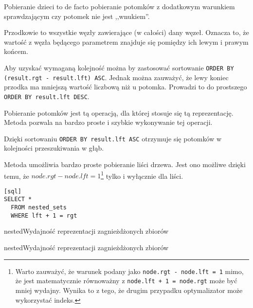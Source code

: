 Pobieranie dzieci to de facto pobieranie potomków z dodatkowym warunkiem sprawdzającym czy potomek nie jest ,,wnukiem''.






Przodkowie to wszystkie węzły zawierające (w całości) dany węzeł.
Oznacza to, że wartość z węzła będącego parametrem znajduje się pomiędzy ich lewym i prawym końcem. 



Aby uzyskać wymaganą kolejność można by zastosować sortowanie \texttt{ORDER BY (result.rgt - result.lft) ASC}.
Jednak można zauważyć, że lewy koniec przodka ma mniejszą wartość liczbową niż u potomka.
Prowadzi to do prostszego \texttt{ORDER BY result.lft DESC}.


Pobieranie potomków jest tą operacją, dla której stosuje się tą reprezentację.
Metoda pozwala na bardzo proste i szybkie wykonywanie tej operacji.


Dzięki sortowaniu \texttt{ORDER BY result.lft ASC} otrzymuje się potomków w kolejności przeszukiwania w głąb.



Metoda umożliwia bardzo proste pobieranie liści drzewa.
Jest ono możliwe dzięki temu, że $node.rgt - node.lft = 1$\footnote{
    Warto zauważyć, że warunek podany jako \texttt{node.rgt - node.lft = 1} mimo,
    że jest matematycznie równoważny z \texttt{node.lft + 1 = node.rgt} może być mniej wydajny.
    Wynika to z tego, że drugim przypadku optymalizator może wykorzystać indeks.
}
tylko i wyłącznie dla liści. 
\begin{verbatim}[sql]
SELECT *
  FROM nested_sets
  WHERE lft + 1 = rgt
\end{verbatim}





\begin{qxtab}{nested}{Wydajność reprezentacji zagnieżdżonych zbiorów}
\end{qxtab}

\begin{qxfig}{nested}{Wydajność reprezentacji zagnieżdżonych zbiorów}
\end{qxfig}

